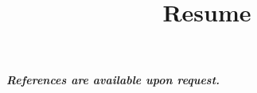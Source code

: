 \documentclass[12pt,a4paper]{moderncv}
\title{Resume}
\begin{document}
\maketitle

















\vspace{1cm}
\emph{\textbf{References are available upon request.}}


\end{document}
